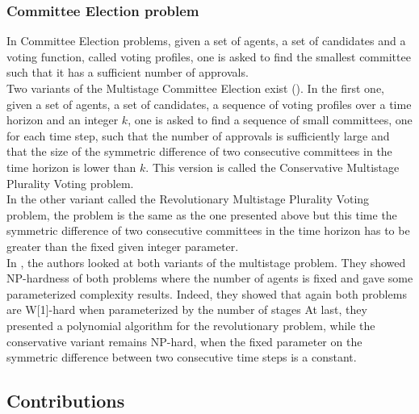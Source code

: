 \documentclass[a4paper]{book}
\begin{document}
\subsubsection{Committee Election problem}
In {\sc Committee Election} problems, given a set of agents, a set of candidates and a voting function, called voting profiles, one is asked to find the smallest committee such that it has a sufficient number of approvals.\\
Two variants of the {\sc Multistage Committee Election}  exist (\cite{multicomm}). In the first one, given a set of agents, a set of candidates, a sequence of voting profiles over a time horizon and an integer $k$, one is asked to find a sequence of small committees, one for each time step, such that the number of approvals is sufficiently large and that the size of the symmetric difference of two consecutive committees in the time horizon is lower than $k$. This version is called the {\sc Conservative Multistage Plurality Voting} problem.\\
In the other variant called the {\sc Revolutionary Multistage Plurality Voting} problem, the problem is the same as the one presented above but this time the symmetric difference of two consecutive committees in the time horizon has to be greater than the fixed given integer parameter.\\

In \cite{multicomm}, the authors looked at both variants of the multistage problem. They showed NP-hardness of both problems where the number of agents is fixed and gave some parameterized complexity results. Indeed, they showed that again both problems are W[1]-hard when parameterized by the number of stages%
At last, they presented a polynomial algorithm for the revolutionary problem, while the conservative variant remains NP-hard, when the fixed parameter on the symmetric difference between two consecutive time steps is a constant. 

\subsection{Contributions}
\end{document}
